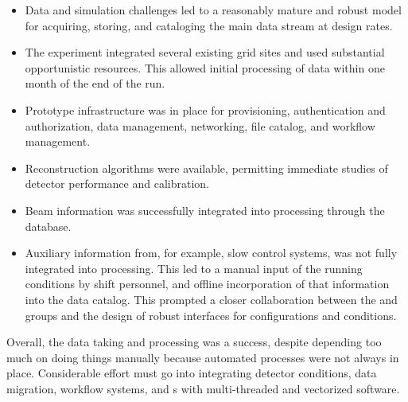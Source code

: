 \begin{itemize}
    \item Data and simulation challenges led to a reasonably mature and robust model for acquiring, storing, and cataloging the main data stream at design rates.
    \item The experiment integrated several existing grid sites and used substantial opportunistic resources.  This allowed initial processing of data within one month of the end of the run.
    \item Prototype infrastructure was in place for provisioning, authentication and authorization, data management, networking, file catalog, and workflow management. 
    \item Reconstruction algorithms were available, permitting immediate studies of detector performance and calibration. 
    \item Beam information was successfully integrated into processing through the  database.
    \item Auxiliary information from, for example, slow control systems, was not fully integrated into processing. This led to a manual input of the running conditions by shift personnel, and offline incorporation of that information into the data catalog. This prompted a closer collaboration between the  and  groups and the design of robust interfaces for configurations and conditions. 
\end{itemize}

Overall, the  data taking and processing was a success, despite depending too much on doing things manually because automated processes were not always in place. Considerable effort must go into integrating detector conditions, data migration, workflow systems, and s with multi-threaded and vectorized software.



